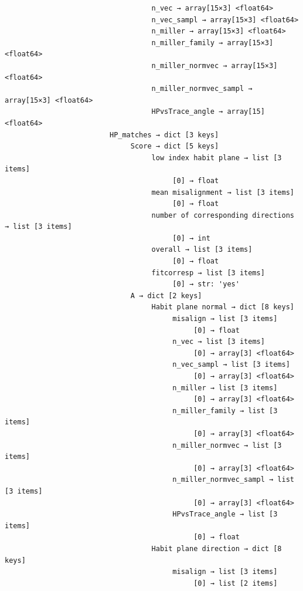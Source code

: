 \documentclass[a4paper,10pt]{article}
\begin{document}
\begin{verbatim}
                                   n_vec → array[15×3] <float64>
                                   n_vec_sampl → array[15×3] <float64>
                                   n_miller → array[15×3] <float64>
                                   n_miller_family → array[15×3] <float64>
                                   n_miller_normvec → array[15×3] <float64>
                                   n_miller_normvec_sampl → array[15×3] <float64>
                                   HPvsTrace_angle → array[15] <float64>
                         HP_matches → dict [3 keys]
                              Score → dict [5 keys]
                                   low index habit plane → list [3 items]
                                        [0] → float
                                   mean misalignment → list [3 items]
                                        [0] → float
                                   number of corresponding directions → list [3 items]
                                        [0] → int
                                   overall → list [3 items]
                                        [0] → float
                                   fitcorresp → list [3 items]
                                        [0] → str: 'yes'
                              A → dict [2 keys]
                                   Habit plane normal → dict [8 keys]
                                        misalign → list [3 items]
                                             [0] → float
                                        n_vec → list [3 items]
                                             [0] → array[3] <float64>
                                        n_vec_sampl → list [3 items]
                                             [0] → array[3] <float64>
                                        n_miller → list [3 items]
                                             [0] → array[3] <float64>
                                        n_miller_family → list [3 items]
                                             [0] → array[3] <float64>
                                        n_miller_normvec → list [3 items]
                                             [0] → array[3] <float64>
                                        n_miller_normvec_sampl → list [3 items]
                                             [0] → array[3] <float64>
                                        HPvsTrace_angle → list [3 items]
                                             [0] → float
                                   Habit plane direction → dict [8 keys]
                                        misalign → list [3 items]
                                             [0] → list [2 items]

\end{verbatim}
\end{document}

